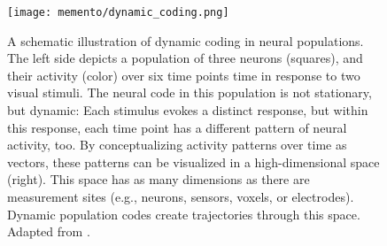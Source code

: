 \begin{figure}
	\centering
	\texttt{[image: memento/dynamic\_coding.png]}
	\caption[The dynamic coding framework]{A schematic illustration of dynamic coding in neural populations. The left side depicts a population of three neurons (squares), and their activity (color) over six time points time in response to two visual stimuli. The neural code in this population is not stationary, but dynamic: Each stimulus evokes a distinct response, but within this response, each time point has a different pattern of neural activity, too. By conceptualizing activity patterns over time as vectors, these patterns can be visualized in a high-dimensional space (right). This space has as many dimensions as there are measurement sites (e.g., neurons, sensors, voxels, or electrodes). Dynamic population codes create trajectories through this space. Adapted from \citet[][Fig. 2]{meyers2018dynamic}.}
	\label{fig:dynamiccoding}
\end{figure}

